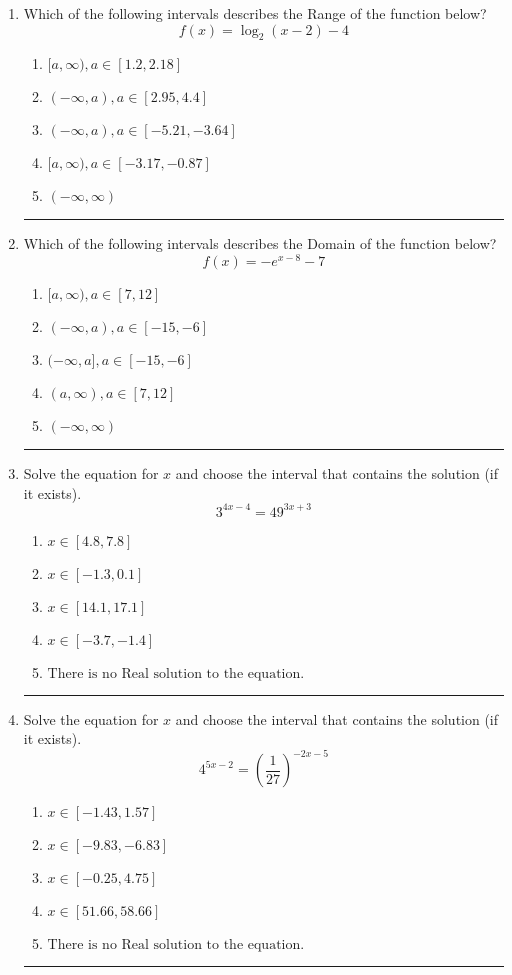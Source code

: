 \documentclass[14pt]{extbook}
\newcommand{\litem}[1]{\item#1\hspace*{-1cm}\rule{\textwidth}{0.4pt}}
\begin{document}
\begin{enumerate}
{\begin{enumerate}[label=\Alph*.]
\end{enumerate} }
\litem{
Which of the following intervals describes the Range of the function below?\[ f(x) = \log_2{(x-2)}-4 \]\begin{enumerate}[label=\Alph*.]
\item \( [a, \infty), a \in [1.2, 2.18] \)
\item \( (-\infty, a), a \in [2.95, 4.4] \)
\item \( (-\infty, a), a \in [-5.21, -3.64] \)
\item \( [a, \infty), a \in [-3.17, -0.87] \)
\item \( (-\infty, \infty) \)

\end{enumerate} }
\litem{
Which of the following intervals describes the Domain of the function below?\[ f(x) = -e^{x-8}-7 \]\begin{enumerate}[label=\Alph*.]
\item \( [a, \infty), a \in [7, 12] \)
\item \( (-\infty, a), a \in [-15, -6] \)
\item \( (-\infty, a], a \in [-15, -6] \)
\item \( (a, \infty), a \in [7, 12] \)
\item \( (-\infty, \infty) \)

\end{enumerate} }
\litem{
Solve the equation for $x$ and choose the interval that contains the solution (if it exists).\[ 3^{4x-4} = 49^{3x+3} \]\begin{enumerate}[label=\Alph*.]
\item \( x \in [4.8, 7.8] \)
\item \( x \in [-1.3, 0.1] \)
\item \( x \in [14.1, 17.1] \)
\item \( x \in [-3.7, -1.4] \)
\item \( \text{There is no Real solution to the equation.} \)

\end{enumerate} }
\litem{
Solve the equation for $x$ and choose the interval that contains the solution (if it exists).\[ 4^{5x-2} = \left(\frac{1}{27}\right)^{-2x-5} \]\begin{enumerate}[label=\Alph*.]
\item \( x \in [-1.43, 1.57] \)
\item \( x \in [-9.83, -6.83] \)
\item \( x \in [-0.25, 4.75] \)
\item \( x \in [51.66, 58.66] \)
\item \( \text{There is no Real solution to the equation.} \)


\end{enumerate}}
\end{enumerate}
\end{document}
